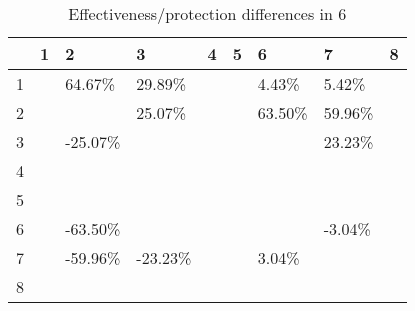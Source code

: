 \begin{table}[ht]
\centering
\begin{tabular}{rllllllll}
  \hline
 & 1 & 2 & 3 & 4 & 5 & 6 & 7 & 8 \\ 
  \hline
1 &  & 64.67\% & 29.89\% &  &  & 4.43\% & 5.42\% &  \\ 
  2 &  &  & 25.07\% &  &  & 63.50\% & 59.96\% &  \\ 
  3 &  & -25.07\% &  &  &  &  & 23.23\% &  \\ 
  4 &  &  &  &  &  &  &  &  \\ 
  5 &  &  &  &  &  &  &  &  \\ 
  6 &  & -63.50\% &  &  &  &  & -3.04\% &  \\ 
  7 &  & -59.96\% & -23.23\% &  &  & 3.04\% &  &  \\ 
  8 &  &  &  &  &  &  &  &  \\ 
   \hline
\end{tabular}
\caption{Effectiveness/protection differences in  6} 
\end{table}
